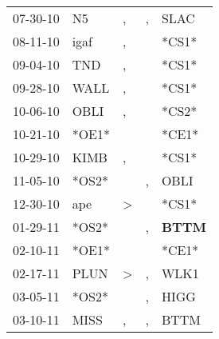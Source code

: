 \begin{supertabular}{p{0.07\textwidth}p{0.06\textwidth}p{0.02\textwidth}p{0.02\textwidth}p{0.06\textwidth}}
          07-30-10\textsuperscript{} &             N5\textsuperscript{} &                , &                , &           SLAC\textsuperscript{} \\
          08-11-10\textsuperscript{} &           igaf\textsuperscript{} &                , &                  &                            *CS1* \\
          09-04-10\textsuperscript{} &            TND\textsuperscript{} &                , &                  &                            *CS1* \\
          09-28-10\textsuperscript{} &           WALL\textsuperscript{} &                , &                  &                            *CS1* \\
          10-06-10\textsuperscript{} &           OBLI\textsuperscript{} &                , &                  &                            *CS2* \\
          10-21-10\textsuperscript{} &                            *OE1* &                  &                  &                            *CE1* \\
          10-29-10\textsuperscript{} &           KIMB\textsuperscript{} &                , &                  &                            *CS1* \\
          11-05-10\textsuperscript{} &                            *OS2* &                  &                , &           OBLI\textsuperscript{} \\
          12-30-10\textsuperscript{} &            ape\textsuperscript{} &     \textgreater &                  &                            *CS1* \\
          01-29-11\textsuperscript{} &                            *OS2* &                  &                , &  \textbf{BTTM\textsuperscript{}} \\
          02-10-11\textsuperscript{} &                            *OE1* &                  &                  &                            *CE1* \\
          02-17-11\textsuperscript{} &           PLUN\textsuperscript{} &     \textgreater &                , &           WLK1\textsuperscript{} \\
          03-05-11\textsuperscript{} &                            *OS2* &                  &                , &           HIGG\textsuperscript{} \\
          03-10-11\textsuperscript{} &           MISS\textsuperscript{} &                , &                , &           BTTM\textsuperscript{} \\

\end{supertabular}

